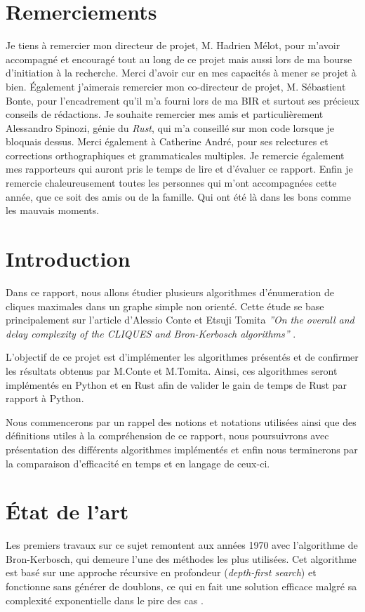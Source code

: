 \documentclass[12pt,a4paper]{article}
\begin{document}
\section*{Remerciements}

Je tiens à remercier mon directeur de projet, M. Hadrien Mélot, pour m'avoir accompagné et encouragé tout au long de ce projet mais aussi lors de ma bourse d'initiation à la recherche. Merci d'avoir cur en mes capacités à mener se projet à bien. Également j'aimerais remercier mon co-directeur de projet, M. Sébastient Bonte, pour l'encadrement qu'il m'a fourni lors de ma BIR et surtout ses précieux conseils de rédactions. Je souhaite remercier mes amis et particulièrement Alessandro Spinozi, génie du \emph{Rust}, qui m'a conseillé sur mon code lorsque je bloquais dessus. Merci également à Catherine André, pour ses relectures et corrections orthographiques et grammaticales multiples. Je remercie également mes rapporteurs qui auront pris le temps de lire et d'évaluer ce rapport.
Enfin je remercie chaleureusement toutes les personnes qui m'ont accompagnées cette année, que ce soit des amis ou de la famille. Qui ont été là dans les bons comme les mauvais moments.

\tableofcontents

\newpage

\section{Introduction}


Dans ce rapport, nous allons étudier plusieurs algorithmes d'énumeration de cliques maximales dans un graphe simple non orienté. Cette étude se base principalement sur l'article d'Alessio Conte et Etsuji Tomita  \textit{''On the overall and delay complexity of the CLIQUES and Bron-Kerbosch algorithms''} \cite{CONTE20221}.

L'objectif de ce projet est d'implémenter les algorithmes présentés et de confirmer les résultats obtenus par M.Conte et M.Tomita. Ainsi, ces algorithmes seront implémentés en Python et en Rust afin de valider le gain de temps de Rust par rapport à Python.

Nous commencerons par un rappel des notions et notations utilisées ainsi que des définitions utiles à la compréhension de ce rapport, nous poursuivrons avec présentation des différents algorithmes implémentés et enfin nous terminerons par la comparaison d'efficacité en temps et en langage de ceux-ci.


\section{État de l'art}%
\label{sec:etat}
Les premiers travaux sur ce sujet remontent aux années 1970 avec l'algorithme de Bron-Kerbosch\cite{bron1973algorithm}, qui demeure l'une des méthodes les plus utilisées. Cet algorithme est basé sur une approche récursive en profondeur (\textit{depth-first search}) et fonctionne sans générer de doublons, ce qui en fait une solution efficace malgré sa complexité exponentielle dans le pire des cas .
\end{document}
